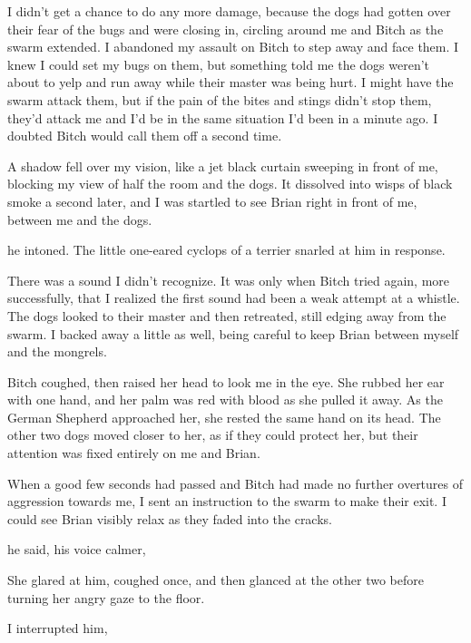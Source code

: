 I didn't get a chance to do any more damage, because the dogs had gotten over their fear of the bugs and were closing in, circling around me and Bitch as the swarm extended. I abandoned my assault on Bitch to step away and face them. I knew I could set my bugs on them, but something told me the dogs weren't about to yelp and run away while their master was being hurt. I might have the swarm attack them, but if the pain of the bites and stings didn't stop them, they'd attack me and I'd be in the same situation I'd been in a minute ago. I doubted Bitch would call them off a second time.

A shadow fell over my vision, like a jet black curtain sweeping in front of me, blocking my view of half the room and the dogs. It dissolved into wisps of black smoke a second later, and I was startled to see Brian right in front of me, between me and the dogs.

 he intoned. The little one-eared cyclops of a terrier snarled at him in response.

There was a sound I didn't recognize. It was only when Bitch tried again, more successfully, that I realized the first sound had been a weak attempt at a whistle. The dogs looked to their master and then retreated, still edging away from the swarm. I backed away a little as well, being careful to keep Brian between myself and the mongrels.

Bitch coughed, then raised her head to look me in the eye. She rubbed her ear with one hand, and her palm was red with blood as she pulled it away. As the German Shepherd approached her, she rested the same hand on its head. The other two dogs moved closer to her, as if they could protect her, but their attention was fixed entirely on me and Brian.

When a good few seconds had passed and Bitch had made no further overtures of aggression towards me, I sent an instruction to the swarm to make their exit. I could see Brian visibly relax as they faded into the cracks.

 he said, his voice calmer, 

She glared at him, coughed once, and then glanced at the other two before turning her angry gaze to the floor.


 I interrupted him, 

